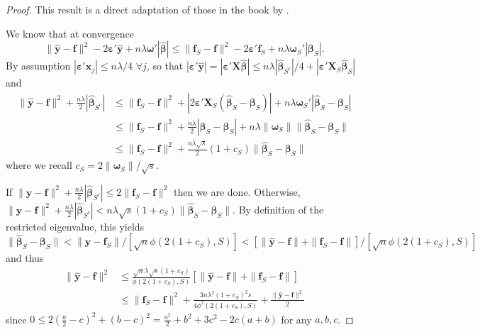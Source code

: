 \documentclass[12pt]{article}
\newcommand{\bs}[1]{\boldsymbol{#1}}
\newcommand{\bm}[1]{\mathbf{#1}}
\begin{document}
\begin{proof}
This result is a direct adaptation of those in the book by \cite{buhlmann_statistics_2011}.

\noindent We know that at convergence
\[
\|\bm{\hat y}-\bm{f}\|^2 - 2\bs{\varepsilon}'\bm{\hat y} + n\lambda\bs{\omega}'|\bs{\hat\beta}| \leq
\|\bm{f}_S-\bm{f}\|^2 - 2\bs{\varepsilon}'\bm{f}_S + n\lambda\bs{\omega}_S'|\bs{\beta}_S|.
\]
By assumption $|\bs{\varepsilon}'\bs{x}_j|\leq n\lambda/4$ $\forall j$, so that $|\bs{\varepsilon}'\bm{\hat y}| = |\bs{\varepsilon}'\bm{X}\bs{\hat\beta}|
\leq n\lambda|\bs{\hat\beta}_{S^c}|/4 + |\bs{\varepsilon}'\bm{X}_S\bs{\hat\beta}_S|$ and
\begin{align*}
\|\bm{\hat y}-\bm{f}\|^2 + \frac{n\lambda}{2}|\bs{\hat\beta}_{S^c}| &\leq 
\|\bm{f}_S-\bm{f}\|^2 + |2\bs{\varepsilon}'\bm{X}_S (\bs{\hat\beta}_S - \bs{\beta}_S)| + n\lambda\bs{\omega}_S'|\bs{\hat\beta}_S - \bs{\beta}_S|\\
&\leq \|\bm{f}_S-\bm{f}\|^2 + \frac{n\lambda}{2}|\bs{\hat\beta}_S - \bs{\beta}_S| + n\lambda\|\bs{\omega}_S\|\|\bs{\hat\beta}_S - \bs{\beta}_S\|\\
&\leq \|\bm{f}_S-\bm{f}\|^2 + \frac{n\lambda\sqrt{s}}{2}\left(1+c_S\right)\|\bs{\hat\beta}_S - \bs{\beta}_S\|
\end{align*}
where we recall $c_S = 2\|\bs{\omega}_S\|/\sqrt{s}$.

If $\|\bm{\hat y}-\bm{f}\|^2 + \frac{n\lambda}{2}|\bs{\hat\beta}_{S^c}|\leq2\|\bm{f}_S-\bm{f}\|^2 $ then we are done.  Otherwise,
$\|\bm{\hat y}-\bm{f}\|^2 + \frac{n\lambda}{2}|\bs{\hat\beta}_{S^c}| <
n\lambda \sqrt{s}\left(1+c_S\right)\|\bs{\hat\beta}_S - \bs{\beta}_S\|$.  By definition of the restricted eigenvalue, this yields $\|\bs{\hat\beta}_S - \bs{\beta}_S\| < 
\|\bm{\hat y} - \bm{f}_S\|/[\sqrt{n}\phi(2(1+c_S),S)] < \left[\|\bm{\hat y} - \bm{f}\| + \|\bm{f}_S-\bm{f}\|\right]/[\sqrt{n}\phi(2(1+c_S),S)]$ and thus
\begin{align*}
\|\bm{\hat y}-\bm{f}\|^2 &\leq \frac{\sqrt{n}\lambda\sqrt{s}(1+c_S)}{\phi(2(1+c_S),S)}
\left[\|\bm{\hat y} - \bm{f}\| + \|\bm{f}_S-\bm{f}\|\right] \\
&\leq  \|\bm{f}_S-\bm{f}\|^2 + \frac{3n\lambda^2(1+c_S)^2s}{4\phi^2(2(1+c_S),S)} +
\frac{\|\bm{\hat y}-\bm{f}\|^2}{2}
\end{align*}
since $0 \leq 2(\frac{a}{2}-c)^2 + (b-c)^2 = \frac{a^2}{2}+b^2+3c^2-2c(a+b)$ for any $a,b,c$.  
\end{proof}


\end{document}
